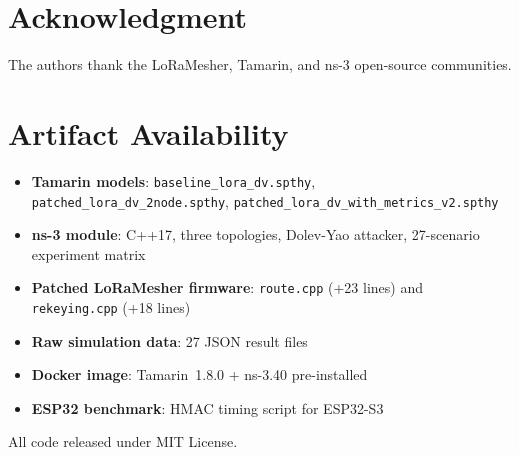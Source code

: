 \documentclass[10pt,journal,compsoc]{IEEEtran}
\begin{document}
\section*{Acknowledgment}
The authors thank the LoRaMesher, Tamarin, and ns-3 open-source
communities.

\appendix
\section{Artifact Availability}
\label{app:artifact}

\begin{itemize}
  \item \textbf{Tamarin models}:
    \texttt{baseline\_lora\_dv.spthy},
    \texttt{patched\_lora\_dv\_2node.spthy},
    \texttt{patched\_lora\_dv\_with\_metrics\_v2.spthy}
  \item \textbf{ns-3 module}: C++17, three topologies,
    Dolev-Yao attacker, 27-scenario experiment matrix
  \item \textbf{Patched LoRaMesher firmware}:
    \texttt{route.cpp} (+23 lines) and \texttt{rekeying.cpp} (+18 lines)
  \item \textbf{Raw simulation data}: 27 JSON result files
  \item \textbf{Docker image}: Tamarin~1.8.0 + ns-3.40 pre-installed
  \item \textbf{ESP32 benchmark}: HMAC timing script for ESP32-S3
\end{itemize}

All code released under MIT License.



\end{document}
